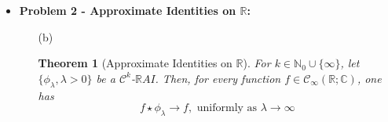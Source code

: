 \documentclass[12pt, reqno]{amsart}
\newtheorem{theorem}{Theorem}[section]
\theoremstyle{definition}
\theoremstyle{remark}
\begin{document}
\begin{itemize}
\begin{itemize}

\end{itemize}

\vspace{0.2 cm}
\item {\bf{Problem 2 - Approximate Identities on $\mathbb{R}$:}} 

\vspace{0.1 cm}
\begin{itemize}

\vspace{0.1 cm}
\item[(b)] %


\begin{theorem}[Approximate Identities on $\mathbb{R}$] \label{RAI}
    For $k\in \mathbb{N}_{0}\cup\{\infty\}$, let $\{\phi_{\lambda},\lambda>0\}$ be a $\mathcal{C}^{k}$-$\mathbb{R}AI$. Then, for every function $f\in\mathcal{C}_{\infty}(\mathbb{R};\mathbb{C})$, one has $$f\star \phi_{\lambda} \rightarrow f,\text{ uniformly as }\lambda \rightarrow \infty$$     
\end{theorem}


\end{itemize}
\end{itemize}
\end{document}
